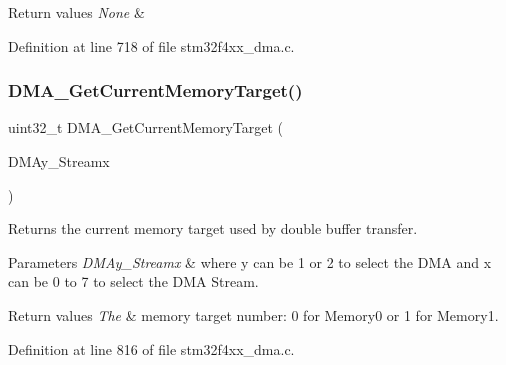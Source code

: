 \begin{DoxyRetVals}{Return values}
{\em None} & \\
\hline
\end{DoxyRetVals}


Definition at line 718 of file stm32f4xx\+\_\+dma.\+c.

\mbox{\label{group___d_m_a___group3_ga74b6624f9faa2f43c9369ddbdeab241c}} 
\subsubsection{\texorpdfstring{D\+M\+A\+\_\+\+Get\+Current\+Memory\+Target()}{DMA\_GetCurrentMemoryTarget()}}
{\footnotesize\ttfamily uint32\+\_\+t D\+M\+A\+\_\+\+Get\+Current\+Memory\+Target (\begin{DoxyParamCaption}\item[{\hyperlink{struct_d_m_a___stream___type_def}{D\+M\+A\+\_\+\+Stream\+\_\+\+Type\+Def} $\ast$}]{D\+M\+Ay\+\_\+\+Streamx }\end{DoxyParamCaption})}



Returns the current memory target used by double buffer transfer. 


\begin{DoxyParams}{Parameters}
{\em D\+M\+Ay\+\_\+\+Streamx} & where y can be 1 or 2 to select the D\+MA and x can be 0 to 7 to select the D\+MA Stream. \\
\hline
\end{DoxyParams}

\begin{DoxyRetVals}{Return values}
{\em The} & memory target number\+: 0 for Memory0 or 1 for Memory1. \\
\hline
\end{DoxyRetVals}


Definition at line 816 of file stm32f4xx\+\_\+dma.\+c.

\mbox{\label{group___d_m_a___group3_ga4ebcffd32eb6968ac61cfb64a6bae258}} 

